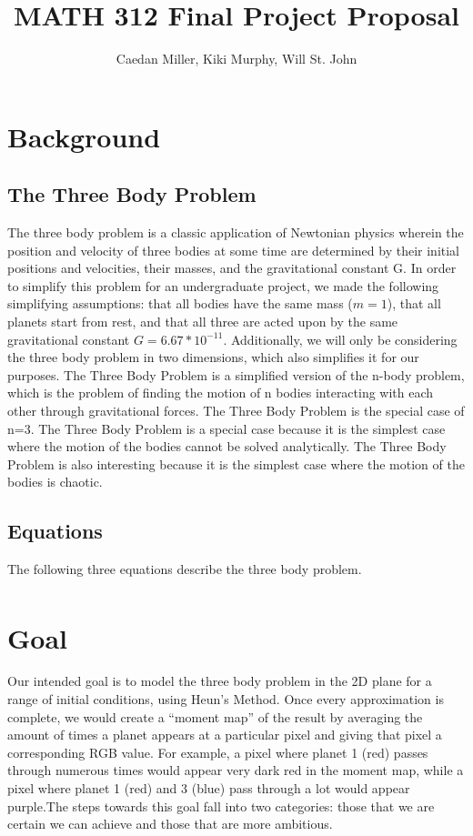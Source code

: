 \documentclass{article}
\author{Caedan Miller, Kiki Murphy, Will St. John}
\title{MATH 312 Final Project Proposal}
\begin{document}
\maketitle
\section{Background}
\subsection{The Three Body Problem}
The three body problem is a classic application of Newtonian physics wherein the position and velocity of three bodies at some time are determined by their initial positions and velocities, their masses, and the gravitational constant G. In order to simplify this problem for an undergraduate project, we made the following simplifying assumptions: that all bodies have the same mass ($m=1$), that all planets start from rest, and that all three are acted upon by the same gravitational constant $G=6.67*10^{-11}$. Additionally, we will only be considering the three body problem in two dimensions, which also simplifies it for our purposes. 
The Three Body Problem is a simplified version of the n-body problem, which is the problem of finding the motion of n bodies interacting with each other through gravitational forces. The Three Body Problem is the special case of n=3. The Three Body Problem is a special case because it is the simplest case where the motion of the bodies cannot be solved analytically. The Three Body Problem is also interesting because it is the simplest case where the motion of the bodies is chaotic.


\subsection{Equations}
The following three equations describe the three body problem. 
\begin{align}
    
\end{align}


\section{Goal}
Our intended goal is to model the three body problem in the 2D plane for a range of initial conditions, using Heun’s Method. Once every approximation is complete, we would create a “moment map” of the result by averaging the amount of times a planet appears at a particular pixel and giving that pixel a corresponding RGB value. For example, a pixel where planet 1 (red) passes through numerous times would appear very dark red in the moment map, while a pixel where planet 1 (red) and 3 (blue) pass through a lot would appear purple.The steps towards this goal fall into two categories: those that we are certain we can achieve and those that are more ambitious.
\end{document}
